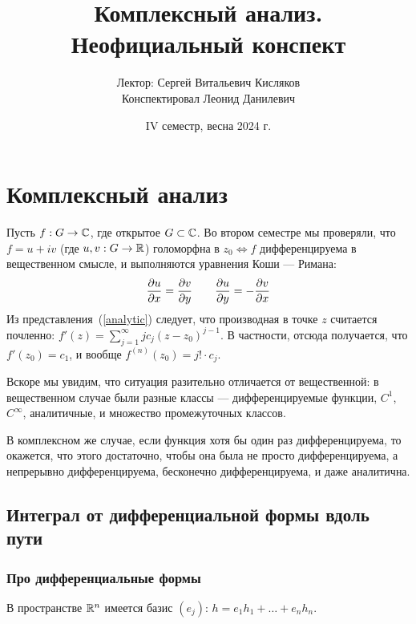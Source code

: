 \documentclass[a4paper]{report}
\date{IV семестр, весна 2024 г.}
\title{Комплексный анализ. Неофициальный конспект}
\author{Лектор: Сергей Витальевич Кисляков \\ Конспектировал Леонид Данилевич}
\begin{document}
    \maketitle
    \tableofcontents
    \newpage
    \setcounter{lection}{0}
    \chapter{Комплексный анализ}
    Пусть $f: G \rightarrow \mathbb{C}$, где открытое $G \subset \mathbb{C}$.
    Во втором семестре мы проверяли, что $f = u + iv$ (где $u, v: G \rightarrow \mathbb{R}$) голоморфна в $z_0 \iff f$ дифференцируема в вещественном смысле, и выполняются уравнения Коши --- Римана:
    \[\frac{\partial u}{\partial x} = \frac{\partial v}{\partial y} \qquad \frac{\partial u}{\partial y} = -\frac{\partial v}{\partial x}\]
    Из представления~(\ref{analytic}) следует, что производная в точке $z$ считается почленно: $f'(z) = \sum\limits_{j = 1}^{\infty}j c_j (z - z_0)^{j - 1}$.
    В частности, отсюда получается, что $f'(z_0) = c_1$, и вообще $f^{(n)}(z_0) = j! \cdot c_j$.

    Вскоре мы увидим, что ситуация разительно отличается от вещественной: в вещественном случае были разные классы --- дифференцируемые функции, $C^1$, $C^\infty$, аналитичные, и множество промежуточных классов.

    В комплексном же случае, если функция хотя бы один раз дифференцируема, то окажется, что этого достаточно, чтобы она была не просто дифференцируема, а непрерывно дифференцируема, бесконечно дифференцируема, и даже аналитична.
    \section{Интеграл от дифференциальной формы вдоль пути}
    \subsection{Про дифференциальные формы}
    В пространстве $\mathbb{R}^n$ имеется базис $(e_j)$: $h = e_1 h_1 + \dots + e_n h_n$.
\end{document}
